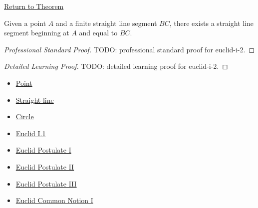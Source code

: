 \newpage
{}
\label{prf:euclid-i-2}

\begin{remark*}[Return]
\hyperref[thm:euclid-i-2]{Return to Theorem}
\end{remark*}

\begin{theorem*}
Given a point $A$ and a finite straight line segment $BC$, there exists a
straight line segment beginning at $A$ and equal to $BC$.
\end{theorem*}

\begin{proof}[Professional Standard Proof]
\LRAProofBodyStart
TODO: professional standard proof for euclid-i-2.
\end{proof}

\begin{proof}[Detailed Learning Proof]
\LRAProofBodyStart
TODO: detailed learning proof for euclid-i-2.
\end{proof}

\begin{remark*}
\end{remark*}

\begin{dependencies}
\begin{itemize}
  \item \hyperref[def:euclid-point]{Point}
  \item \hyperref[def:euclid-straight-line]{Straight line}
  \item \hyperref[def:euclid-circle]{Circle}
  \item \hyperref[thm:euclid-i-1]{Euclid I.1}
  \item \hyperref[ax:euclid-postulate-draw-straight-line]{Euclid Postulate I}
  \item \hyperref[ax:euclid-postulate-produce-straight-line]{Euclid Postulate II}
  \item \hyperref[ax:euclid-postulate-describe-circle]{Euclid Postulate III}
  \item \hyperref[ax:euclid-common-notion-things-equal-to-same]{Euclid Common Notion I}
\end{itemize}
\end{dependencies}

\clearpage
